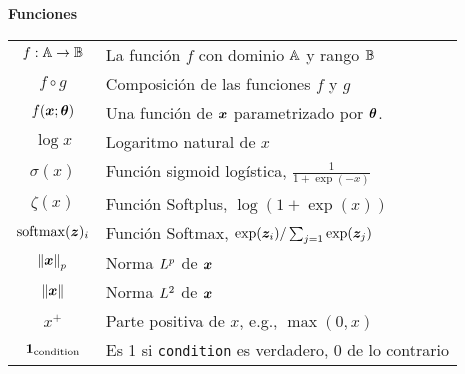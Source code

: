 \vspace{\notationgap}
\begin{minipage}{\textwidth}
\centerline{\bf Funciones}
\bgroup
\def\arraystretch{1.5}
\begin{tabular}{cp{}}
$\displaystyle f: {\mathbb{A}} \rightarrow {\mathbb{B}}$ & La función $f$ con dominio ${\mathbb{A}}$ y rango ${\mathbb{B}}$\\
$\displaystyle f \circ g $             & Composición de las funciones $f$ y $g$ \\
  $\displaystyle f({\bm{x}} ; {\bm{\theta}}) $    & Una función de ${\bm{x}}$ parametrizado por ${\bm{\theta}}$. \\
$\displaystyle \log x$                 & Logaritmo natural de $x$ \\
$\displaystyle \sigma(x)$              & Función sigmoid logística, $\displaystyle \frac{1} {1 + \exp(-x)}$ \\
$\displaystyle \zeta(x)$               & Función Softplus, $\log(1 + \exp(x))$ \\
$\displaystyle \mathrm{softmax}({\bm{z}})_i$                & Función Softmax, $\exp({\bm{z}}_i) / \sum_{j=1} \exp({\bm{z}}_j)$ \\
$\displaystyle \left\lVert{\bm{x}}\right\rVert_p $          & Norma $L^p$ de ${\bm{x}}$ \\
$\displaystyle \left\lVert{\bm{x}}\right\rVert $            & Norma $L^2$ de ${\bm{x}}$ \\
$\displaystyle x^+$                    & Parte positiva de $x$, e.g., $\max(0,x)$\\
$\displaystyle \bm{1}_\mathrm{condition}$  & Es 1 si \texttt{condition} es verdadero, 0 de lo contrario\\
\end{tabular}
\egroup
{}
\end{minipage}



